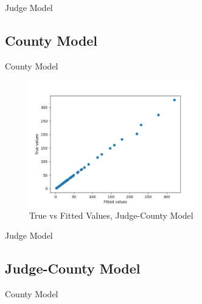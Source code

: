 \documentclass[11pt]{article}
\begin{document}
    \begin{table}[H]
      \centering
      \caption{Judge Model}
      
    \end{table}

  \subsection{County Model}

    \begin{table}[H]
      \centering
      \caption{County Model}
      
    \end{table}

    \begin{figure}[H]
      \centering
      \includegraphics[width=0.65\textwidth]{../../../output/figures/Exploration/fit_min_County}
      \caption{True vs Fitted Values, Judge-County Model}
    \end{figure}

    \begin{table}[H]
      \centering
      \caption{Judge Model}
      
    \end{table}

  \subsection{Judge-County Model}

    \begin{table}[H]
      \centering
      \caption{County Model}
      
    \end{table}
\end{document}
